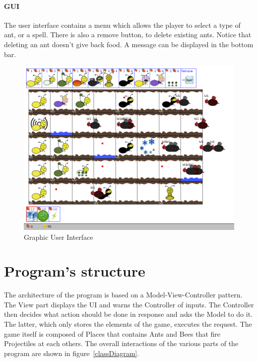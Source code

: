 \documentclass[a4paper]{article}
\begin{document}
\paragraph{GUI} The user interface contains a menu which allows the player to select a type of ant, or a spell. There is also a remove button, to delete existing ants. Notice that deleting an ant doesn't give back food. A message can be displayed in the bottom bar.

\begin{figure}[H]
	\center
	\includegraphics[scale=0.3]{screen2.png}
	\caption{Graphic User Interface}
	\label{gui}
\end{figure}


\section{Program's structure}

The architecture of the program is based on a Model-View-Controller pattern. The View part displays the UI and warns the Controller of inputs. The Controller then decides what action should be done in response and asks the Model to do it. The latter, which only stores the elements of the game, executes the request.
The game itself is composed of Places that contains Ants and Bees that fire Projectiles at each others.
The overall interactions of the various parts of the program are shown in figure~\ref{classDiagram}.
\end{document}
